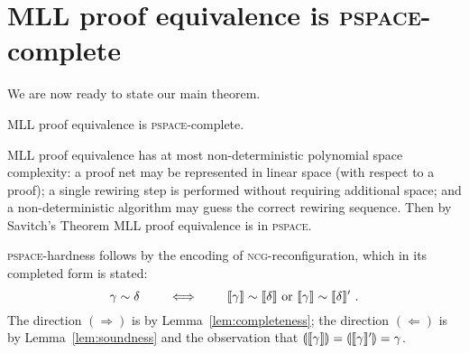 \documentclass[conference]{IEEEtran}
\begin{document}
\section{MLL proof equivalence is \textsc{pspace}-complete}


We are now ready to state our main theorem.


\begin{theorem}
MLL proof equivalence is \textsc{pspace}-complete.
\end{theorem}

\begin{IEEEproof}
MLL proof equivalence has at most non-deterministic polynomial space complexity: a proof net may be represented in linear space (with respect to a proof); a single rewiring step is performed without requiring additional space; and a non-deterministic algorithm may guess the correct rewiring sequence.
%
Then by Savitch's Theorem \cite{Savitch-1970} MLL proof equivalence is in \textsc{pspace}.


\textsc{pspace}-hardness follows by the encoding of \textsc{ncg}-reconfiguration, which in its completed form is stated:
\[
	\gamma\perm\delta \qquad\iff\qquad \itn\gamma\perm\itn\delta \text{ or } \itn\gamma\perm\itn\delta'~.
\]
%
The direction $(\Rightarrow)$ is by Lemma~\ref{lem:completeness}; the direction $(\Leftarrow)$ is by Lemma~\ref{lem:soundness} and the observation that $\llparenthesis\llbracket\gamma\rrbracket\rrparenthesis=\llparenthesis\llbracket\gamma\rrbracket'\rrparenthesis=\gamma$.
%
\end{IEEEproof}





\end{document}
